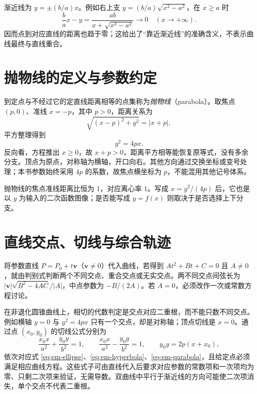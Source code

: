渐近线为 $y=\pm(b/a)x$。例如右上支 $y=(b/a)\sqrt{x^2-a^2}$，在 $x\ge a$ 时
\[
 \frac ba x-y=\frac{ab}{x+\sqrt{x^2-a^2}}\longrightarrow0
 \quad(x\longrightarrow+\infty).
\]
因而点到对应直线的距离也趋于零；这给出了“靠近渐近线”的准确含义，不表示曲线最终与直线重合。

\section{抛物线的定义与参数约定}
到定点与不经过它的定直线距离相等的点集称为\emph{抛物线}（parabola）。取焦点 $(p,0)$、准线 $x=-p$，其中 $p>0$，距离关系为
\[
 \sqrt{(x-p)^2+y^2}=|x+p|,
\]
平方整理得到
\begin{equation}\label{eq:em-parabola}
 y^2=4px.
\end{equation}
反向看，方程推出 $x\ge0$，故 $x+p>0$，距离平方相等能恢复原等式，没有多余分支。顶点为原点，对称轴为横轴，开口向右。其他方向通过交换坐标或变号处理；本书参数始终采用 $4p$ 的系数，故焦点横坐标为 $p$，不能混用其他记号体系。

抛物线的焦点准线距离比恒为 $1$，对应离心率 $1$。写成 $x=y^2/(4p)$ 后，它也是以 $y$ 为输入的二次函数图像；是否能写成 $y=f(x)$ 则取决于是否选择上下分支。

\section{直线交点、切线与综合轨迹}
将参数直线 $P=P_0+t\boldsymbol v$（$\boldsymbol v\ne0$）代入曲线，若得到 $At^2+Bt+C=0$ 且 $A\ne0$，就由判别式判断两个不同交点、重合交点或无实交点。两不同交点间弦长为 $|\boldsymbol v|\sqrt{B^2-4AC}/|A|$，中点参数为 $-B/(2A)$。若 $A=0$，必须改作一次或常数方程讨论。

在非退化圆锥曲线上，相切的代数判定是交点对应二重根，而不能只数不同交点。例如横轴 $y=0$ 与 $y^2=4px$ 只有一个交点，却是对称轴；顶点切线是 $x=0$。通过点 $(x_0,y_0)$ 的切线公式分别为
\[
 \frac{x_0x}{a^2}+\frac{y_0y}{b^2}=1,\qquad
 \frac{x_0x}{a^2}-\frac{y_0y}{b^2}=1,\qquad
 y_0y=2p(x+x_0),
\]
依次对应式 \eqref{eq:em-ellipse}、\eqref{eq:em-hyperbola}、\eqref{eq:em-parabola}，且给定点必须满足相应曲线方程。这些式子可由直线代入后要求对应参数的常数项和一次项均为零、只剩二次项来验证，无需导数。双曲线中平行于渐近线的方向可能使二次项消失，单个交点不代表二重根。

